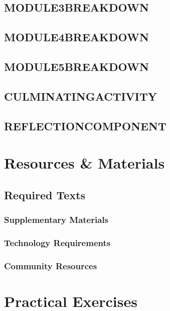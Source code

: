 \documentclass{article}
\begin{document}
\subsection{MODULE3BREAKDOWN}

\subsection{MODULE4BREAKDOWN}

\subsection{MODULE5BREAKDOWN}

\subsection{CULMINATINGACTIVITY}

\subsection{REFLECTIONCOMPONENT}

\pagebreak

\section{Resources \& Materials}

\subsection{Required Texts}

\subsubsection{Supplementary Materials}

\subsubsection{Technology Requirements}

\subsubsection{Community Resources}

\vspace{1cm}

\pagebreak

\section{Practical Exercises}
\end{document}

